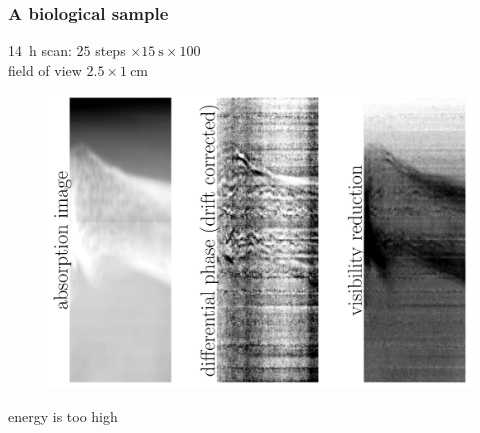 \documentclass[first,firstsupp]{ETHclass}
\begin{document}
    \begin{frame}
        \frametitle{A biological sample}
        \SI{14}{\hour} scan: $25$ steps $\times \SI{15}{\second} \times
        100$\\
        field of view $2.5\times \SI{1}{\centi\metre}$
        \begin{figure}[h]
            \centering
            \includegraphics[height=.5\textheight]{2013_05_21_toe.pdf}
        \end{figure}
        \alert{energy is too high}
    \end{frame}
\end{document}
